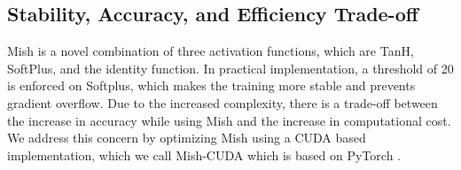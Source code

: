 \documentclass{bmvc2k}
\begin{document}
\begin{table}[h]
	\begin{center}
	\end{center}
	\caption{Comparison between Leaky ReLU and Mish activation functions on object detection on MS-COCO 2017 dataset with a test image size of 736 x 736.}
	\label{tab:coco1}
\end{table}

\subsection{Stability, Accuracy, and Efficiency Trade-off}

Mish is a novel combination of three activation functions, which are TanH, SoftPlus, and the identity function. In practical implementation, a threshold of 20 is enforced on Softplus, which makes the training more stable and prevents gradient overflow. Due to the increased complexity, there is a trade-off between the increase in accuracy while using Mish and the increase in computational cost. We address this concern by optimizing Mish using a CUDA based implementation, which we call Mish-CUDA which is based on PyTorch \cite{paszke2019pytorch}.
\end{document}

